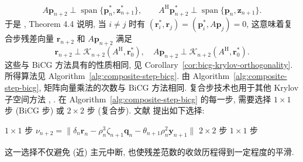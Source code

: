 \[A\bm p_{n+2}\perp\operatorname{span}\{\bm p_n^{*},\bm z_{n+1}^{*}\},\qquad A^{\mathrm H}\bm p_{n+2}^{*}\perp\operatorname{span}\{\bm p_n,\bm z_{n+1}\}.\]
{于是 , Theorem 4.4 说明, 当 $i\ne j$ 时有 $(\bm r_i^{*},\bm r_j)=(\bm p_i^{*},A\bm p_j)=0$, 这意味着复合步残差向量 $\bm r_{n+2}$ 和 $A\bm p_{n+2}$ 满足}
\[\bm r_{n+2}\perp\mathcal K_{n+2}(A^{\mathrm H},\bm r_0^{*}),\quad A\bm p_{n+2}\perp\mathcal K_{n+2}(A^{\mathrm H},\bm r_0^{*}).\]
{这些与 BiCG 方法具有的性质相同, 见 Corollary\ \ref{cor:bicg-krylov-orthogonality}. 所得算法见 Algorithm\ \ref{alg:composite-step-bicg}.}
{由 Algorithm\ \ref{alg:composite-step-bicg}, 矩阵向量乘法的次数与 BiCG 方法相同. 复合步技术也用于其他 Krylov 子空间方法 , .}
{在 Algorithm\ \ref{alg:composite-step-bicg} 的每一步, 需要选择 $1\times1$ 步 (BiCG 步) 或 $2\times2$ 步 (复合步). 文献  提出如下选择:}
\begin{algorithmic}[1]
\State $1\times1$ {步}
\Else
\State $\nu_{n+2}=\|\delta_n\bm r_n-\rho_n^3\zeta_{n+1}\bm q_n-\theta_{n+1}\rho_n^2\bm y_{n+1}\|$
\State $2\times2$ {步}
\Else\State $1\times1$ {步}\EndIf\EndIf
\end{algorithmic}
{这一选择不仅避免 (近) 主元中断, 也使残差范数的收敛历程得到一定程度的平滑.}
